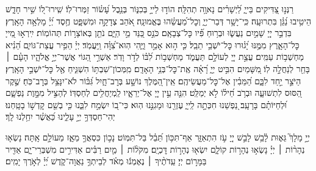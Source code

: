 \begin{narrow}
	
	רַנְּנ֣וּ צַ֭דִּיקִים בַּייָ֑
	לַ֝יְשָׁרִ֗ים נָאוָ֥ה תְהִלָּֽה׃
	הוֹד֣וּ לַייָ֣ בְּכִנּ֑וֹר בְּנֵ֥בֶל עָ֝שׂ֗וֹר זַמְּרוּ־לֽוֹ׃
	שִֽׁירוּ־ל֭וֹ שִׁ֣יר חָדָ֑שׁ הֵיטִ֥יבוּ נַ֝גֵּ֗ן בִּתְרוּעָֽה׃
	כִּֽי־יָשָׁ֥ר דְּבַר־יְיָ֑ וְכׇל־מַ֝עֲשֵׂ֗הוּ בֶּאֱמוּנָֽה׃
	אֹ֭הֵב צְדָקָ֣ה וּמִשְׁפָּ֑ט חֶ֥סֶד יְ֝יָ֗ מָלְאָ֥ה הָאָֽרֶץ׃
	בִּדְבַ֣ר יְיָ֭ שָׁמַ֣יִם נַעֲשׂ֑וּ וּבְר֥וּחַ פִּ֗֝יו כׇּל־צְבָאָֽם׃
	כֹּנֵ֣ס כַּ֭נֵּד מֵ֣י הַיָּ֑ם נֹתֵ֖ן בְּאוֹצָר֣וֹת תְּהוֹמֽוֹת׃
	יִֽירְא֣וּ מֵ֭ייָ כׇּל־הָאָ֑רֶץ מִמֶּ֥נּוּ יָ֝ג֗וּרוּ כׇּל־יֹשְׁבֵ֥י תֵבֵֽל׃
	כִּ֤י ה֣וּא אָמַ֣ר וַיֶּ֑הִי הֽוּא־צִ֝וָּ֗ה וַֽיַּעֲמֹֽד׃
	יְיָ֗ הֵפִ֥יר עֲצַת־גּוֹיִ֑ם הֵ֝נִ֗יא מַחְשְׁב֥וֹת עַמִּֽים׃
	עֲצַ֣ת יְיָ֭ לְעוֹלָ֣ם תַּעֲמֹ֑ד מַחְשְׁב֥וֹת לִ֝בּ֗וֹ לְדֹ֣ר וָדֹֽר׃
	אַשְׁרֵ֣י הַ֭גּוֹי אֲשֶׁר־יְיָ֣ אֱלֹהָ֑יו הָעָ֓ם ׀ בָּחַ֖ר לְנַחֲלָ֣ה לֽוֹ׃
	מִ֭שָּׁמַיִם הִבִּ֣יט יְיָ֑ רָ֝אָ֗ה אֶֽת־כׇּל־בְּנֵ֥י הָאָדָֽם׃
	מִֽמְּכוֹן־שִׁבְתּ֥וֹ הִשְׁגִּ֑יחַ אֶ֖ל כׇּל־יֹשְׁבֵ֣י הָאָֽרֶץ׃
	הַיֹּצֵ֣ר יַ֣חַד לִבָּ֑ם הַ֝מֵּבִ֗ין אֶל־כׇּל־מַעֲשֵׂיהֶֽם׃
	אֵֽין־הַ֭מֶּלֶךְ נוֹשָׁ֣ע בְּרׇב־חָ֑יִל גִּ֝בּ֗וֹר לֹא־יִנָּצֵ֥ל בְּרׇב־כֹּֽחַ׃
	שֶׁ֣קֶר הַ֭סּוּס לִתְשׁוּעָ֑ה וּבְרֹ֥ב חֵ֝יל֗וֹ לֹ֣א יְמַלֵּֽט׃
	הִנֵּ֤ה עֵ֣ין יְיָ֭ אֶל־יְרֵאָ֑יו לַֽמְיַחֲלִ֥ים לְחַסְדּֽוֹ׃
	לְהַצִּ֣יל מִמָּ֣וֶת נַפְשָׁ֑ם וּ֝לְחַיּוֹתָ֗ם בָּרָעָֽב׃
	נַ֭פְשֵׁנוּ חִכְּתָ֣ה לַֽייָ֑ עֶזְרֵ֖נוּ וּמָגִנֵּ֣נוּ הֽוּא׃
	כִּי־ב֭וֹ יִשְׂמַ֣ח לִבֵּ֑נוּ כִּ֤י בְשֵׁ֖ם קׇדְשׁ֣וֹ בָטָֽחְנוּ׃
	יְהִי־חַסְדְּךָ֣ יְיָ֣ עָלֵ֑ינוּ כַּ֝אֲשֶׁ֗ר יִחַ֥לְנוּ לָֽךְ׃
\end{narrow}

\begin{narrow}
	\mizmorshabbat
	
	יְיָ֣ מָלָךְ֮ גֵּא֢וּת לָ֫בֵ֥שׁ
	לָבֵ֣שׁ יְיָ֭ עֹ֣ז הִתְאַזָּ֑ר אַף־תִּכּ֥וֹן תֵּ֝בֵ֗ל בַּל־תִּמּֽוֹט׃
	נָכ֣וֹן כִּסְאֲךָ֣ מֵאָ֑ז מֵעוֹלָ֣ם אָֽתָּה׃
	נָשְׂא֤וּ נְהָר֨וֹת ׀ יְיָ֗ נָשְׂא֣וּ נְהָר֣וֹת קוֹלָ֑ם יִשְׂא֖וּ נְהָר֣וֹת דׇּכְיָֽם׃
	מִקֹּל֨וֹת ׀ מַ֤יִם רַבִּ֗ים אַדִּירִ֣ים מִשְׁבְּרֵי־יָ֑ם אַדִּ֖יר בַּמָּר֣וֹם יְיָ׃
	עֵֽדֹתֶ֨יךָ ׀ נֶאֶמְנ֬וּ מְאֹ֗ד לְבֵיתְךָ֥ נַאֲוָה־קֹ֑דֶשׁ יְ֝יָ֗ לְאֹ֣רֶךְ יָמִֽים׃
	
\end{narrow}


